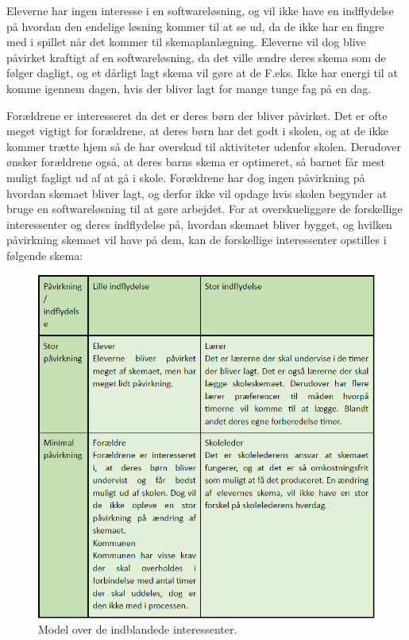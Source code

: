 Eleverne har ingen interesse i en softwareløsning, og vil ikke have en indflydelse på hvordan den endelige løsning kommer til at se ud, da de ikke har en fingre med i spillet når det kommer til skemaplanlægning. Eleverne vil dog blive påvirket kraftigt af en softwareløsning, da det ville ændre deres skema som de følger dagligt, og et dårligt lagt skema vil gøre at de F.eks. Ikke har energi til at komme igennem dagen, hvis der bliver lagt for mange tunge fag på en dag.

Forældrene er interesseret da det er deres børn der bliver påvirket. Det er ofte meget vigtigt for forældrene, at deres børn har det godt i skolen, og at de ikke kommer trætte hjem så de har overskud til aktiviteter udenfor skolen. Derudover ønsker forældrene også, at deres barns skema er optimeret, så barnet får mest muligt fagligt ud af at gå i skole. Forældrene har dog ingen påvirkning på hvordan skemaet bliver lagt, og derfor ikke vil opdage hvis skolen begynder at bruge en softwareløsning til at gøre arbejdet\cite{interview}.
For at overskueliggøre de forskellige interessenter og deres indflydelse på, hvordan skemaet bliver bygget, og hvilken påvirkning skemaet vil have på dem, kan de forskellige interessenter opstilles i følgende skema:
\begin{figure}[!h]
  \centering
  \includegraphics[width=\textwidth]{partials/graphics/interessentanalyse.png}
  \caption{Model over de indblandede interessenter.}
  \label{fig:interessenter}
\end{figure}
